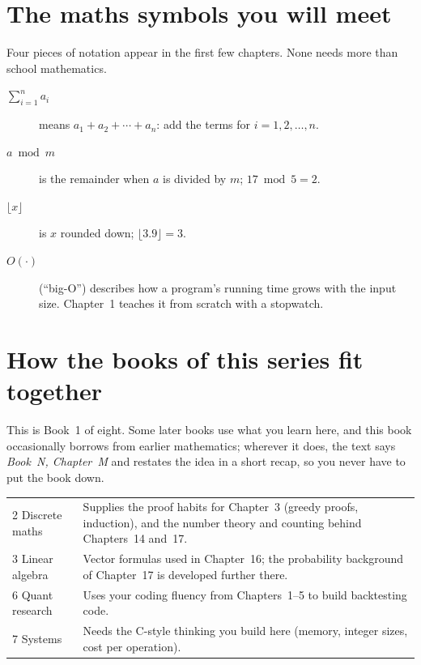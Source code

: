 \section*{The maths symbols you will meet}

Four pieces of notation appear in the first few chapters. None needs more than
school mathematics.
\begin{description}
\item[$\sum_{i=1}^{n} a_i$] means $a_1+a_2+\cdots+a_n$: add the terms for
      $i=1,2,\dots,n$.
\item[$a \bmod m$] is the remainder when $a$ is divided by $m$; $17\bmod 5=2$.
\item[$\lfloor x\rfloor$] is $x$ rounded down; $\lfloor 3.9\rfloor=3$.
\item[$O(\cdot)$] (``big-O'') describes how a program's running time grows with
      the input size. Chapter~1 teaches it from scratch with a stopwatch.
\end{description}

\section*{How the books of this series fit together}\label{sec:start-map}

This is Book~1 of eight. Some later books use what you learn here, and this book
occasionally borrows from earlier mathematics; wherever it does, the text says
\emph{Book~N, Chapter~M} and restates the idea in a short recap, so you never have
to put the book down.

\begin{center}
\begin{tabular}{P{2.2cm}P{9.2cm}}
\toprule
{} & \\
 Discrete maths & Supplies the proof habits for Chapter~3 (greedy proofs, induction), and the number theory and counting behind Chapters~14 and~17.\\
3 Linear algebra & Vector formulas used in Chapter~16; the probability background of Chapter~17 is developed further there.\\
6 Quant research & Uses your coding fluency from Chapters~1--5 to build backtesting code.\\
7 Systems & Needs the C-style thinking you build here (memory, integer sizes, cost per operation).\\
\bottomrule
\end{tabular}
\end{center}

